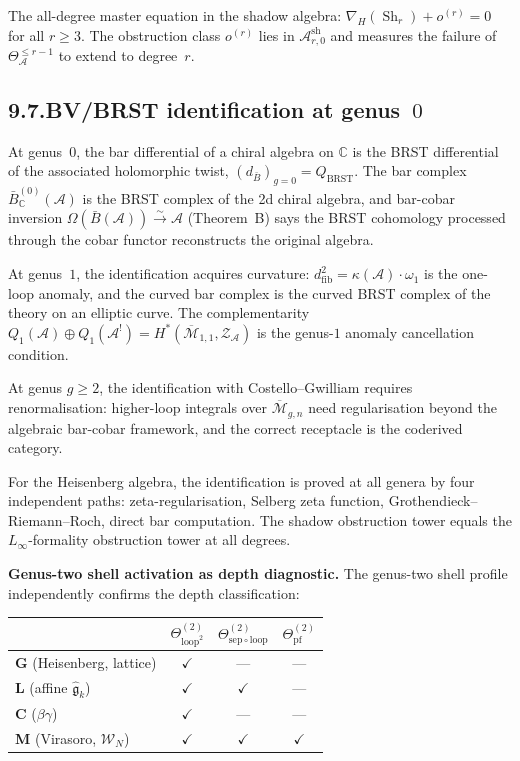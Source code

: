 \documentclass[11pt]{report}
\theoremstyle{definition}
\theoremstyle{remark}
\providecommand{\cA}{\mathcal{A}}
\providecommand{\cM}{\mathcal{M}}
\providecommand{\cZ}{\mathcal{Z}}
\providecommand{\barB}{\bar{B}}
\numberwithin{equation}{section}
\begin{document}
The all-degree master equation in the shadow algebra:
$\nabla_H(\operatorname{Sh}_r)+o^{(r)}=0$ for all $r\ge 3$. The
obstruction class $o^{(r)}$ lies in $\cA^{\mathrm{sh}}_{r,0}$ and
measures the failure of $\Theta^{\le r-1}_\cA$ to extend to degree~$r$.

\subsection*{9.7.\enspace BV/BRST identification at genus~$0$}

At genus~$0$, the bar differential of a chiral algebra on $\mathbb C$
is the BRST differential of the associated holomorphic twist,
$(d_{\barB})_{g=0}=Q_{\mathrm{BRST}}$. The bar complex
$\barB^{(0)}_{\mathbb C}(\cA)$ is the BRST complex of the 2d chiral
algebra, and bar-cobar inversion
$\Omega(\barB(\cA))\xrightarrow{\sim}\cA$ (Theorem~B) says the BRST
cohomology processed through the cobar functor reconstructs the
original algebra.

At genus~$1$, the identification acquires curvature:
$d^2_{\mathrm{fib}}=\kappa(\cA)\cdot\omega_1$ is the one-loop anomaly,
and the curved bar complex is the curved BRST complex of the theory
on an elliptic curve. The complementarity
$Q_1(\cA)\oplus Q_1(\cA^!)=H^*(\overline{\cM}_{1,1},\cZ_\cA)$ is the
genus-$1$ anomaly cancellation condition.

At genus $g\ge 2$, the identification with Costello--Gwilliam
requires renormalisation: higher-loop integrals over
$\overline{\cM}_{g,n}$ need regularisation beyond the algebraic
bar-cobar framework, and the correct receptacle is the coderived
category.

For the Heisenberg algebra, the identification is proved at all genera
by four independent paths: zeta-regularisation, Selberg zeta function,
Grothendieck--Riemann--Roch, direct bar computation. The shadow
obstruction tower equals the $L_\infty$-formality obstruction tower
at all degrees.

\medskip
\noindent\textbf{Genus-two shell activation as depth diagnostic.}\enspace
The genus-two shell profile independently confirms the depth
classification:

\begin{center}
\renewcommand{\arraystretch}{1.15}
\begin{tabular}{lccc}
& $\Theta^{(2)}_{\mathrm{loop}^2}$ & $\Theta^{(2)}_{\mathrm{sep}\circ\mathrm{loop}}$ & $\Theta^{(2)}_{\mathrm{pf}}$\\
\hline
\textbf{G} (Heisenberg, lattice) & $\checkmark$ & --- & ---\\
\textbf{L} (affine $\widehat{\mathfrak g}_k$) & $\checkmark$ & $\checkmark$ & ---\\
\textbf{C} ($\beta\gamma$) & $\checkmark$ & --- & ---\\
\textbf{M} (Virasoro, $\mathcal W_N$) & $\checkmark$ & $\checkmark$ & $\checkmark$
\end{tabular}
\end{center}
\end{document}
